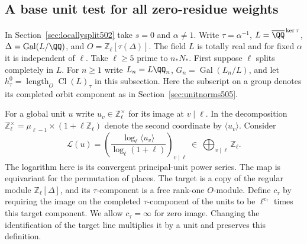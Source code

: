\documentclass[a4paper,11pt]{article}
\theoremstyle{definition}
\theoremstyle{remark}
\newcommand{\ZZ}{\mathbb Z}\newcommand{\ord}{\operatorname{ord}}
\numberwithin{equation}{section}
\newcommand{\Cl}{\operatorname{Cl}}
\begin{document}
\subsection{A base unit test for all zero-residue weights}
\label{sec:baseunit506}

In Section~\ref{sec:locallysplit502} take \(s=0\) and
\(\alpha\ne1\). Write \(\tau=\alpha^{-1}\),
\(L=\overline{\QQ}^{\,\ker\tau}\), \(\Delta=\operatorname{Gal}(L/\QQ)\),
and \(O=\ZZ_\ell[\tau(\Delta)]\). The field \(L\) is totally
real and for fixed \(\alpha\) it is independent of \(\ell\).
Take \(\ell\ge5\) prime to \(n_*N_*\). First suppose \(\ell\)
splits completely in \(L\). For \(n\ge1\) write
\(L_n=L\QQ_n\), \(G_n=\operatorname{Gal}(L_n/L)\), and
let \(h^0_\tau=\operatorname{length}_O\Cl(L)_\tau\) in this
subsection. Here the subscript on a group denotes its completed
orbit component as in Section~\ref{sec:unitnorms505}.

For a global unit \(u\) write \(u_v\in\ZZ_\ell^\times\) for
its image at \(v\mid\ell\). In the decomposition
\(\ZZ_\ell^\times=\mu_{\ell-1}\times(1+\ell\ZZ_\ell)\) denote
the second coordinate by \(\langle u_v\rangle\). Consider
\[
 \mathcal L(u)=\left(
     \frac{\log_\ell\langle u_v\rangle}{\log_\ell(1+\ell)}
                    \right)_{v\mid\ell}
     \ \in\ \bigoplus_{v\mid\ell}\ZZ_\ell .
\]
The logarithm here is its convergent principal-unit power
series. The map is equivariant for the permutation of places.
The target is a copy of the regular module \(\ZZ_\ell[\Delta]\),
and its \(\tau\)-component is a free rank-one \(O\)-module.
Define \(c_\tau\) by requiring the image on the completed
\(\tau\)-component of the units to be \(\ell^{c_\tau}\) times
this target component. We allow \(c_\tau=\infty\) for zero image.
Changing the identification of the target line multiplies it
by a unit and preserves this definition.
\end{document}
